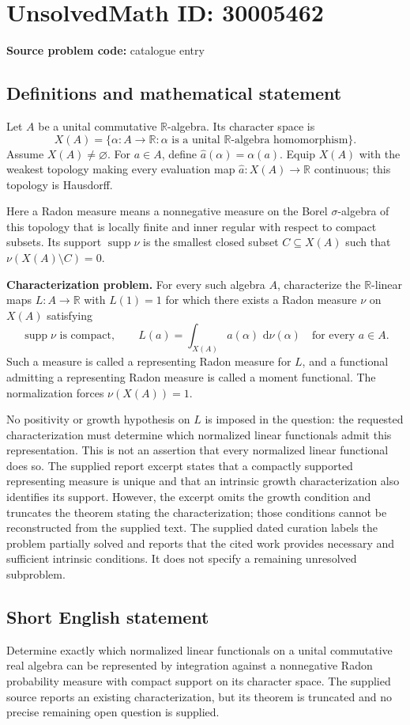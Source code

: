 \documentclass[11pt]{article}
\newcommand{\R}{\mathbb{R}}
\newcommand{\dd}{\,\mathrm{d}}
\begin{document}
\section*{UnsolvedMath ID: 30005462}
\textbf{Source problem code:} catalogue entry
\subsection{Definitions and mathematical statement}
Let \(A\) be a unital commutative \(\R\)-algebra. Its character space is
\[
X(A)=\{\alpha:A\to\R:\alpha\text{ is a unital }\R\text{-algebra homomorphism}\}.
\]
Assume \(X(A)\ne\varnothing\). For \(a\in A\), define \(\widehat a(\alpha)=\alpha(a)\). Equip \(X(A)\) with the weakest topology making every evaluation map \(\widehat a:X(A)\to\R\) continuous; this topology is Hausdorff.

Here a Radon measure means a nonnegative measure on the Borel \(\sigma\)-algebra of this topology that is locally finite and inner regular with respect to compact subsets. Its support \(\operatorname{supp}\nu\) is the smallest closed subset \(C\subseteq X(A)\) such that \(\nu(X(A)\setminus C)=0\).

\textbf{Characterization problem.} For every such algebra \(A\), characterize the \(\R\)-linear maps \(L:A\to\R\) with \(L(1)=1\) for which there exists a Radon measure \(\nu\) on \(X(A)\) satisfying
\[
\operatorname{supp}\nu\text{ is compact},\qquad
L(a)=\int_{X(A)}\widehat a(\alpha)\,\dd\nu(\alpha)
\quad\text{for every }a\in A.
\]
Such a measure is called a representing Radon measure for \(L\), and a functional admitting a representing Radon measure is called a moment functional. The normalization forces \(\nu(X(A))=1\).

No positivity or growth hypothesis on \(L\) is imposed in the question: the requested characterization must determine which normalized linear functionals admit this representation. This is not an assertion that every normalized linear functional does so. The supplied report excerpt states that a compactly supported representing measure is unique and that an intrinsic growth characterization also identifies its support. However, the excerpt omits the growth condition and truncates the theorem stating the characterization; those conditions cannot be reconstructed from the supplied text. The supplied dated curation labels the problem partially solved and reports that the cited work provides necessary and sufficient intrinsic conditions. It does not specify a remaining unresolved subproblem.
\subsection{Short English statement}
Determine exactly which normalized linear functionals on a unital commutative real algebra can be represented by integration against a nonnegative Radon probability measure with compact support on its character space. The supplied source reports an existing characterization, but its theorem is truncated and no precise remaining open question is supplied.
\end{document}
